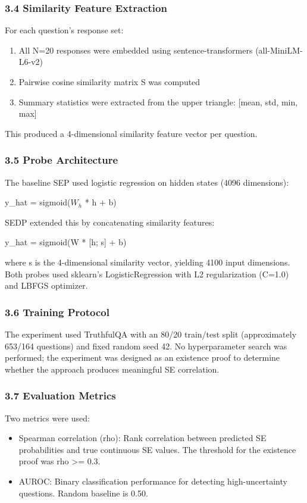 \subsubsection{3.4 Similarity Feature Extraction}

For each question's response set:
\begin{enumerate}
\item All N=20 responses were embedded using sentence-transformers (all-MiniLM-L6-v2)
\item Pairwise cosine similarity matrix S was computed
\item Summary statistics were extracted from the upper triangle: [mean, std, min, max]
\end{enumerate}

This produced a 4-dimensional similarity feature vector per question.

\subsubsection{3.5 Probe Architecture}

The baseline SEP used logistic regression on hidden states (4096 dimensions):

y\_hat = sigmoid($W_h$ * h + b)

SEDP extended this by concatenating similarity features:

y\_hat = sigmoid(W * [h; s] + b)

where s is the 4-dimensional similarity vector, yielding 4100 input dimensions. Both probes used sklearn's LogisticRegression with L2 regularization (C=1.0) and LBFGS optimizer.

\subsubsection{3.6 Training Protocol}

The experiment used TruthfulQA \citep{Lin2022TruthfulQA} with an 80/20 train/test split (approximately 653/164 questions) and fixed random seed 42. No hyperparameter search was performed; the experiment was designed as an existence proof to determine whether the approach produces meaningful SE correlation.

\subsubsection{3.7 Evaluation Metrics}

Two metrics were used:

\begin{itemize}
\item Spearman correlation (rho): Rank correlation between predicted SE probabilities and true continuous SE values. The threshold for the existence proof was rho >= 0.3.
\end{itemize}

\begin{itemize}
\item AUROC: Binary classification performance for detecting high-uncertainty questions. Random baseline is 0.50.
\end{itemize}
